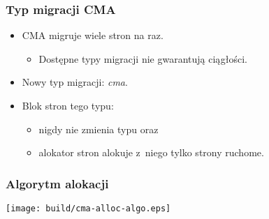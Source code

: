 \begin{frame}
  \frametitle{Typ migracji CMA}

  \begin{itemize}
  \item CMA migruje wiele stron na raz.
    \begin{itemize}
    \item Dostępne typy migracji nie gwarantują ciągłości.
    \end{itemize}
  \item Nowy typ migracji: \textit{cma}.
  \item Blok stron tego typu:
    \begin{itemize}
    \item nigdy nie zmienia typu oraz
    \item alokator stron alokuje z~niego tylko strony ruchome.
    \end{itemize}
  \end{itemize}
\end{frame}

\begin{frame}
  \frametitle{Algorytm alokacji}

  \begin{center}
    \texttt{[image: build/cma-alloc-algo.eps]}
  \end{center}

\end{frame}
